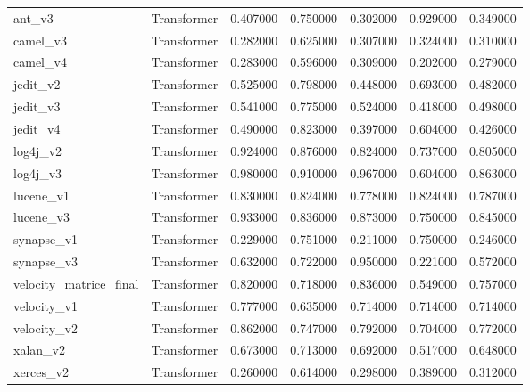 \begin{table}
\begin{tabular}{llrrrrr}
ant_v3 & Transformer & 0.407000 & 0.750000 & 0.302000 & 0.929000 & 0.349000 \\
camel_v3 & Transformer & 0.282000 & 0.625000 & 0.307000 & 0.324000 & 0.310000 \\
camel_v4 & Transformer & 0.283000 & 0.596000 & 0.309000 & 0.202000 & 0.279000 \\
jedit_v2 & Transformer & 0.525000 & 0.798000 & 0.448000 & 0.693000 & 0.482000 \\
jedit_v3 & Transformer & 0.541000 & 0.775000 & 0.524000 & 0.418000 & 0.498000 \\
jedit_v4 & Transformer & 0.490000 & 0.823000 & 0.397000 & 0.604000 & 0.426000 \\
log4j_v2 & Transformer & 0.924000 & 0.876000 & 0.824000 & 0.737000 & 0.805000 \\
log4j_v3 & Transformer & 0.980000 & 0.910000 & 0.967000 & 0.604000 & 0.863000 \\
lucene_v1 & Transformer & 0.830000 & 0.824000 & 0.778000 & 0.824000 & 0.787000 \\
lucene_v3 & Transformer & 0.933000 & 0.836000 & 0.873000 & 0.750000 & 0.845000 \\
synapse_v1 & Transformer & 0.229000 & 0.751000 & 0.211000 & 0.750000 & 0.246000 \\
synapse_v3 & Transformer & 0.632000 & 0.722000 & 0.950000 & 0.221000 & 0.572000 \\
velocity_matrice_final & Transformer & 0.820000 & 0.718000 & 0.836000 & 0.549000 & 0.757000 \\
velocity_v1 & Transformer & 0.777000 & 0.635000 & 0.714000 & 0.714000 & 0.714000 \\
velocity_v2 & Transformer & 0.862000 & 0.747000 & 0.792000 & 0.704000 & 0.772000 \\
xalan_v2 & Transformer & 0.673000 & 0.713000 & 0.692000 & 0.517000 & 0.648000 \\
xerces_v2 & Transformer & 0.260000 & 0.614000 & 0.298000 & 0.389000 & 0.312000 \\
\bottomrule
\end{tabular}
\end{table}

